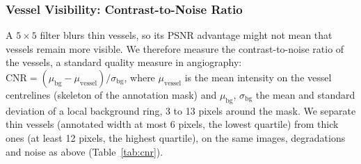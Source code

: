 \documentclass[conference]{IEEEtran}
\begin{document}
\subsubsection{Vessel Visibility: Contrast-to-Noise Ratio}
\label{sec:cnr}

A $5\times5$ filter blurs thin vessels, so its PSNR advantage might not
mean that vessels remain more visible. We therefore measure the
contrast-to-noise ratio of the vessels, a standard quality measure in
angiography: $\mathrm{CNR} = (\mu_{\text{bg}} - \mu_{\text{vessel}})/\sigma_{\text{bg}}$,
where $\mu_{\text{vessel}}$ is the mean intensity on the vessel centrelines
(skeleton of the annotation mask) and $\mu_{\text{bg}}$, $\sigma_{\text{bg}}$
the mean and standard deviation of a local background ring, 3 to 13
pixels around the mask. We separate thin vessels (annotated width at
most 6 pixels, the lowest quartile) from thick ones (at least 12 pixels,
the highest quartile), on the same images, degradations and noise as
above (Table~\ref{tab:cnr}).

\begin{table}[h]
\centering
\footnotesize
\setlength{\tabcolsep}{3pt}
\caption{Vessel CNR (mean over the 100 images) for thin and thick vessels: degraded input, MedVAE, and $5\times5$ Gaussian and median filters. Clean image: $0.88$ (thin) and $1.91$ (thick); MedVAE on the clean image: $0.85$ and $1.90$.}
\label{tab:cnr}
\end{table}
\end{document}
